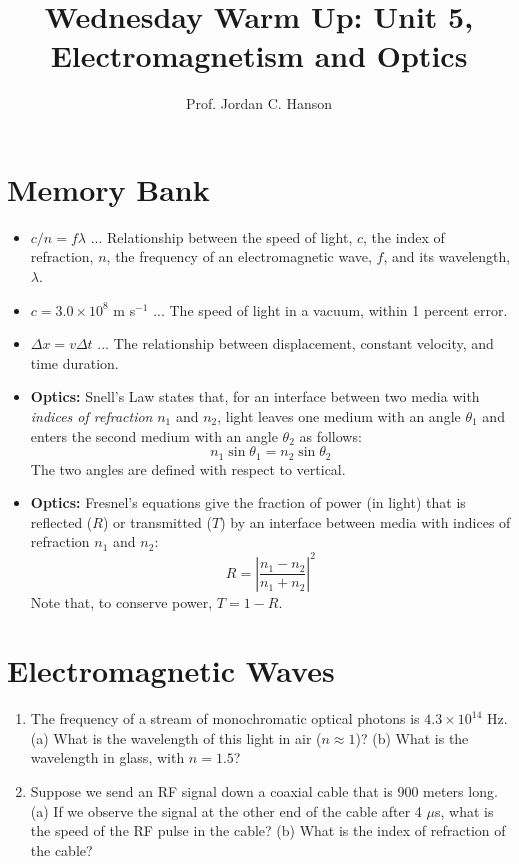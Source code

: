 \documentclass{article}
\begin{document}
\twocolumn

\title{Wednesday Warm Up: Unit 5, Electromagnetism and Optics}
\author{Prof. Jordan C. Hanson}

\maketitle

\section{Memory Bank}

\begin{itemize}
\item $c/n = f \lambda$ ... Relationship between the speed of light, $c$, the index of refraction, $n$, the frequency of an electromagnetic wave, $f$, and its wavelength, $\lambda$.
\item $c = 3.0 \times 10^8$ m s$^{-1}$ ... The speed of light in a vacuum, within 1 percent error.
\item $\Delta x = v \Delta t$ ... The relationship between displacement, constant velocity, and time duration.
\item \textbf{Optics:} Snell's Law states that, for an interface between two media with \textit{indices of refraction} $n_1$ and $n_2$, light leaves one medium with an angle $\theta_1$ and enters the second medium with an angle $\theta_2$ as follows:
\begin{equation}
n_1 \sin\theta_1 = n_2\sin\theta_2
\end{equation}
\noindent The two angles are defined with respect to vertical.
\item \textbf{Optics:} Fresnel's equations give the fraction of power (in light) that is reflected ($R$) or transmitted ($T$) by an interface between media with indices of refraction $n_1$ and $n_2$:
\begin{equation}
R = \left| \frac{n_1 - n_2}{n_1 + n_2} \right|^2 \label{eq:2}
\end{equation}
\noindent Note that, to conserve power, $T = 1 - R$.
\end{itemize}

\section{Electromagnetic Waves}

\begin{enumerate}
\item The frequency of a stream of monochromatic optical photons is $4.3 \times 10^{14}$ Hz.  (a) What is the wavelength of this light in air ($n \approx 1$)?  (b) What is the wavelength in glass, with $n = 1.5$? \\ \vspace{2cm}
\item Suppose we send an RF signal down a coaxial cable that is 900 meters long.  (a) If we observe the signal at the other end of the cable after 4 $\mu$s, what is the speed of the RF pulse in the cable? (b) What is the index of refraction of the cable? \\ \vspace{2cm}
\end{enumerate}
\end{document}
